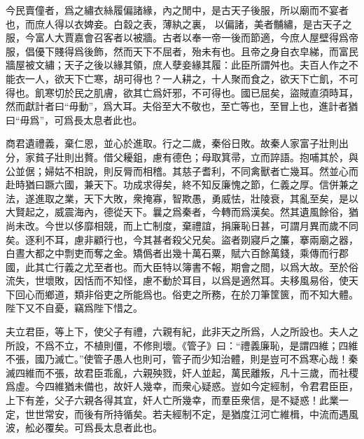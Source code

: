 \documentclass[12pt,a4paper]{ctexbook}
\begin{document}
今民賣僮者，爲之繡衣絲履偏諸緣，內之閒中，是古天子後服，所以廟而不宴者也，而庶人得以衣婢妾。白縠之表，薄紈之裏， 以偏諸，美者黼繡，是古天子之服，今富人大賈嘉會召客者以被牆。古者以奉一帝一後而節適，今庶人屋壁得爲帝服，倡優下賤得爲後飾，然而天下不屈者，殆未有也。且帝之身自衣皁綈，而富民牆屋被文繡；天子之後以緣其領，庶人孽妾緣其履：此臣所謂舛也。夫百人作之不能衣一人，欲天下亡寒，胡可得也？一人耕之，十人聚而食之，欲天下亡飢，不可得也。飢寒切於民之肌膚，欲其亡爲奸邪，不可得也。國已屈矣，盜賊直須時耳，然而獻計者曰“毋動”，爲大耳。夫俗至大不敬也，至亡等也，至冒上也，進計者猶曰“毋爲”，可爲長太息者此也。\par
商君遺禮義，棄仁恩，並心於進取。行之二歲，秦俗日敗。故秦人家富子壯則出分，家貧子壯則出贅。借父耰鉏，慮有德色；母取箕帚，立而誶語。抱哺其於，與公並倨；婦姑不相說，則反脣而相稽。其慈子耆利，不同禽獸者亡幾耳。然並心而赴時猶曰蹶六國，兼天下。功成求得矣，終不知反廉愧之節，仁義之厚。信併兼之法，遂進取之業，天下大敗，衆掩寡，智欺愚，勇威怯，壯陵衰，其亂至矣，是以大賢起之，威震海內，德從天下。曩之爲秦者，今轉而爲漢矣。然其遺風餘俗，猶尚未改。今世以侈靡相競，而上亡制度，棄禮誼，捐廉恥日甚，可謂月異而歲不同矣。逐利不耳，慮非顧行也，今其甚者殺父兄矣。盜者剟寢戶之簾，搴兩廟之器，白晝大都之中剽吏而奪之金。矯僞者出幾十萬石粟，賦六百餘萬錢，乘傳而行郡國，此其亡行義之尤至者也。而大臣特以簿書不報，期會之間，以爲大故。至於俗流失，世壞敗，因恬而不知怪，慮不動於耳目，以爲是適然耳。夫移風易俗，使天下回心而鄉道，類非俗吏之所能爲也。俗吏之所務，在於刀筆筐篋，而不知大體。陛下又不自憂，竊爲陛下惜之。\par
夫立君臣，等上下，使父子有禮，六親有紀，此非天之所爲，人之所設也。夫人之所設，不爲不立，不植則僵，不修則壞。《管子》曰：“禮義廉恥，是謂四維；四維不張，國乃滅亡。”使管子愚人也則可，管子而少知治體，則是豈可不爲寒心哉！秦滅四維而不張，故君臣乖亂，六親殃戮，奸人並起，萬民離叛，凡十三歲，而社稷爲虛。今四維猶未備也，故奸人幾幸，而衆心疑惑。豈如今定經制，令君君臣臣，上下有差，父子六親各得其宜，奸人亡所幾幸，而羣臣衆信，是不疑惑！此業一定，世世常安，而後有所持循矣。若夫經制不定，是猶度江河亡維楫，中流而遇風波，舩必覆矣。可爲長太息者此也。\par
\end{document}
